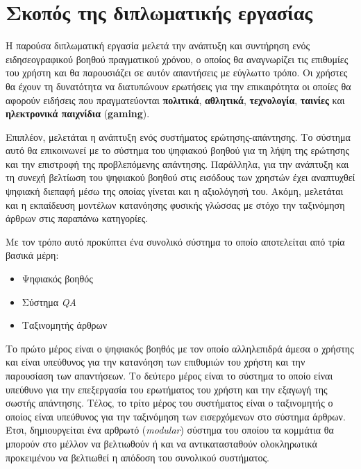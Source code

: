 \section{Σκοπός της διπλωματικής εργασίας}
Η παρούσα διπλωματική εργασία μελετά την ανάπτυξη και συντήρηση ενός ειδησεογραφικού βοηθού πραγματικού χρόνου, ο οποίος θα αναγνωρίζει τις επιθυμίες του χρήστη και θα παρουσιάζει σε αυτόν απαντήσεις με εύγλωττο τρόπο. Οι χρήστες θα έχουν τη δυνατότητα να διατυπώνουν ερωτήσεις για την επικαιρότητα οι οποίες θα αφορούν ειδήσεις που πραγματεύονται \textbf{πολιτικά}, \textbf{αθλητικά}, \textbf{τεχνολογία}, \textbf{ταινίες} και \textbf{ηλεκτρονικά παιχνίδια} (\textbf{gaming}).

Επιπλέον, μελετάται η ανάπτυξη ενός συστήματος ερώτησης-απάντησης. Το σύστημα αυτό θα επικοινωνεί με το σύστημα του ψηφιακού βοηθού για τη λήψη της ερώτησης και την επιστροφή της προβλεπόμενης απάντησης. Παράλληλα, για την ανάπτυξη και τη συνεχή βελτίωση του ψηφιακού βοηθού στις εισόδους των χρηστών έχει αναπτυχθεί ψηφιακή διεπαφή μέσω της οποίας γίνεται και η αξιολόγησή του. Ακόμη, μελετάται και η εκπαίδευση μοντέλων κατανόησης φυσικής γλώσσας με στόχο την ταξινόμηση άρθρων στις παραπάνω κατηγορίες.

Με τον τρόπο αυτό προκύπτει ένα συνολικό σύστημα το οποίο αποτελείται από τρία βασικά μέρη:
\begin{itemize}
    \item Ψηφιακός βοηθός
    \item Σύστημα \emph{QA}
    \item Ταξινομητής άρθρων
\end{itemize}
Το πρώτο μέρος είναι ο ψηφιακός βοηθός με τον οποίο αλληλεπιδρά άμεσα ο χρήστης και είναι υπεύθυνος για την κατανόηση των επιθυμιών του χρήστη και την παρουσίαση των απαντήσεων. Το δεύτερο μέρος είναι το σύστημα το οποίο είναι υπεύθυνο για την επεξεργασία του ερωτήματος του χρήστη και την εξαγωγή της σωστής απάντησης. Τέλος, το τρίτο μέρος του συστήματος είναι ο ταξινομητής ο οποίος είναι υπεύθυνος για την ταξινόμηση των εισερχόμενων στο σύστημα άρθρων. Έτσι, δημιουργείται ένα αρθρωτό (\emph{modular}) σύστημα του οποίου τα κομμάτια θα μπορούν στο μέλλον να βελτιωθούν ή και να αντικατασταθούν ολοκληρωτικά προκειμένου να βελτιωθεί η απόδοση του συνολικού συστήματος.